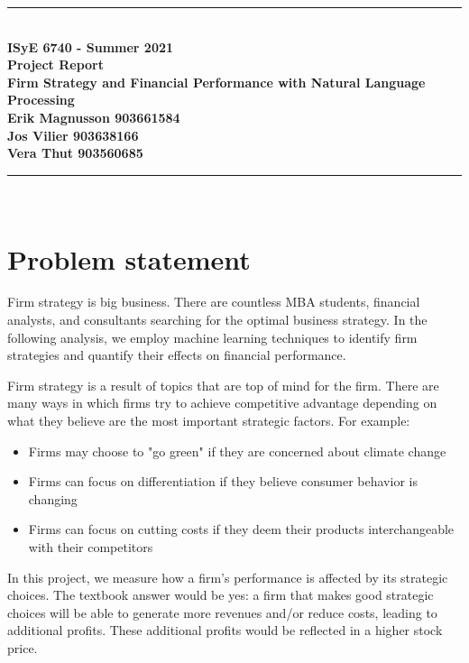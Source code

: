 \documentclass{article}
\begin{document}
\begin{titlepage}
	\clearpage\thispagestyle{empty}
	\centering
	\vspace{1cm}
		
	\rule{\linewidth}{1mm} \\[0.5cm]
	{ \Large \bfseries ISyE 6740 - Summer 2021\\[0.2cm]
	    Project Report \\[0.5cm]
		Firm Strategy and Financial Performance with Natural Language Processing\\[0.5cm]
		Erik Magnusson 903661584\\[0.01cm]
		Jos Vilier 903638166\\[0.01cm]
		Vera Thut 903560685\\[0.01cm]}
	\rule{\linewidth}{1mm} \\[1cm]
\end{titlepage}

{
  \hypersetup{linkcolor=black}
  \tableofcontents
}
\newpage

\section{Problem statement}
Firm strategy is big business. There are countless MBA students, financial analysts, and consultants searching for the optimal business strategy. In the following analysis, we employ machine learning techniques to identify firm strategies and quantify their effects on financial performance. 

Firm strategy is a result of topics that are top of mind for the firm. There are many ways in which firms try to achieve competitive advantage depending on what they believe are the most important strategic factors. For example:
\begin{itemize}
    \item Firms may choose to "go green" if they are concerned about climate change
    \item Firms can focus on differentiation if they believe consumer behavior is changing
    \item Firms can focus on cutting costs if they deem their products interchangeable with their competitors
\end{itemize}
In this project, we measure how a firm's performance is affected by its strategic choices. The textbook answer would be yes: a firm that makes good strategic choices will be able to generate more revenues and/or reduce costs, leading to additional profits. These additional profits would be reflected in a higher stock price. 
\end{document}
